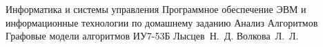 \documentclass{bmstu}
\begin{document}
\makereporttitle
{Информатика и системы управления} %
{Программное обеспечение ЭВМ и информационные технологии}
{по домашнему заданию} %
{Анализ Алгоритмов} %
{Графовые модели алгоритмов} %
{} %
{ИУ7-53Б} %
{Лысцев~Н.~Д.} %
{Волкова~Л.~Л.}

\maketableofcontents


%

%
%

\makebibliography
\end{document}
